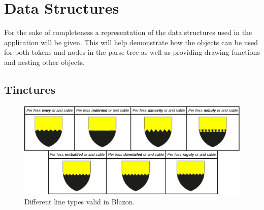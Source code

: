 \chapter{Data Structures}


For the sake of completeness a representation of the data structures used in the application will be given.  This will help demonstrate how the objects can be used for both tokens and nodes in the parse tree as well as providing drawing functions and nesting other objects.


\section{Tinctures}



\begin{figure}[H]
  \centering
    \includegraphics[width=\textwidth]{blazon/images/linetypes.eps}
  \caption{Different line types valid in Blazon.\cite{linetypes}}
  \label{fig:lines}
  
\end{figure}







